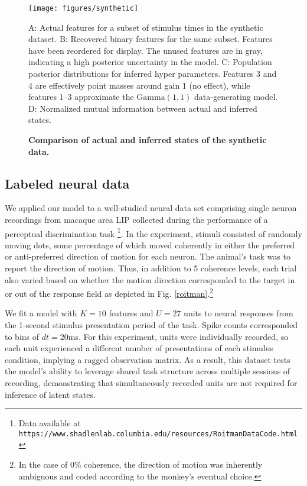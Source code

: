 \documentclass[12pt,a4paper]{article}
\begin{document}
\begin{figure}[!ht]
    \texttt{[image: figures/synthetic]}
	\caption{\bf Comparison of actual and inferred states of the synthetic data.} A: Actual features for a subset of stimulus times in the synthetic dataset. B: Recovered binary features for the same subset. Features have been reordered for display. The unused features are in gray, indicating a high posterior uncertainty in the model. C: Population posterior distributions for inferred hyper parameters. Features 3 and 4 are effectively point masses around gain 1 (no effect), while features 1--3 approximate the $\text{Gamma}(1, 1)$ data-generating model. D: Normalized mutual information between actual and inferred states.
	\label{synthetic}
\end{figure}


\subsection*{Labeled neural data}
We applied our model to a well-studied neural data set comprising single neuron recordings from macaque area LIP collected during the performance of a perceptual discrimination task \cite{roitman2002response}\footnote{Data available at \texttt{https://www.shadlenlab.columbia.edu/resources/RoitmanDataCode.html}}. In the experiment, stimuli consisted of randomly moving dots, some percentage of which moved coherently in either the preferred or anti-preferred direction of motion for each neuron. The animal's task was to report the direction of motion. Thus, in addition to 5 coherence levels, each trial also varied based on whether the motion direction corresponded to the target in or out of the response field as depicted in Fig. \ref{roitman}.\footnote{In the case of 0\% coherence, the direction of motion was inherently ambiguous and coded according to the monkey's eventual choice.}

We fit a model with $K = 10$ features and $U = 27$ units to neural responses from the 1-second stimulus presentation period of the task. Spike counts corresponded to bins of $dt = 20$ms. For this experiment, units were individually recorded, so each unit experienced a different number of presentations of each stimulus condition, implying a ragged observation matrix. As a result, this dataset tests the model's ability to leverage shared task structure across multiple sessions of recording, demonstrating that simultaneously recorded units are not required for inference of latent states.
\end{document}
